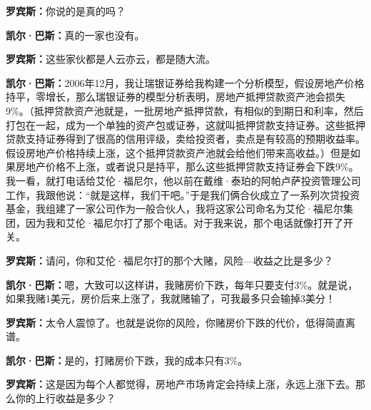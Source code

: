 \begin{BookQuote}
\textbf{罗宾斯：}你说的是真的吗？
\end{BookQuote}

\begin{BookQuote}
\textbf{凯尔·巴斯：}真的一家也没有。
\end{BookQuote}

\begin{BookQuote}
\textbf{罗宾斯：}这些家伙都是人云亦云，都是随大流。
\end{BookQuote}

\begin{BookQuote}
\textbf{凯尔·巴斯：}2006年12月，我让瑞银证券给我构建一个分析模型，假设房地产价格持平，零增长，那么瑞银证券的模型分析表明，房地产抵押贷款资产池会损失9\%。（抵押贷款资产池就是，一批房地产抵押贷款，有相似的到期日和利率，然后打包在一起，成为一个单独的资产包或证券，这就叫抵押贷款支持证券。这些抵押贷款支持证券得到了很高的信用评级，卖给投资者，卖点是有较高的预期收益率。假设房地产价格持续上涨，这个抵押贷款资产池就会给他们带来高收益。）但是如果房地产价格不上涨，或者说只是持平，那么这些抵押贷款支持证券会下跌9\%。我一看，就打电话给艾伦·福尼尔，他以前在戴维·泰珀的阿帕卢萨投资管理公司工作，我跟他说：“就是这样，我们干吧。”于是我们俩合伙成立了一系列次贷投资基金，我组建了一家公司作为一般合伙人，我将这家公司命名为艾伦·福尼尔集团，因为我和艾伦·福尼尔打了那个电话。对于我来说，那个电话就像打开了开关。
\end{BookQuote}

\begin{BookQuote}
\textbf{罗宾斯：}请问，你和艾伦·福尼尔打的那个大赌，风险—收益之比是多少？
\end{BookQuote}

\begin{BookQuote}
\textbf{凯尔·巴斯：}嗯，大致可以这样讲，我赌房价下跌，每年只要支付3\%。就是说，如果我赌1美元，房价后来上涨了，我就赌输了，可我最多只会输掉3美分！
\end{BookQuote}

\begin{BookQuote}
\textbf{罗宾斯：}太令人震惊了。也就是说你的风险，你赌房价下跌的代价，低得简直离谱。
\end{BookQuote}

\begin{BookQuote}
\textbf{凯尔·巴斯：}是的，打赌房价下跌，我的成本只有3\%。
\end{BookQuote}

\begin{BookQuote}
\textbf{罗宾斯：}这是因为每个人都觉得，房地产市场肯定会持续上涨，永远上涨下去。那么你的上行收益是多少？
\end{BookQuote}

